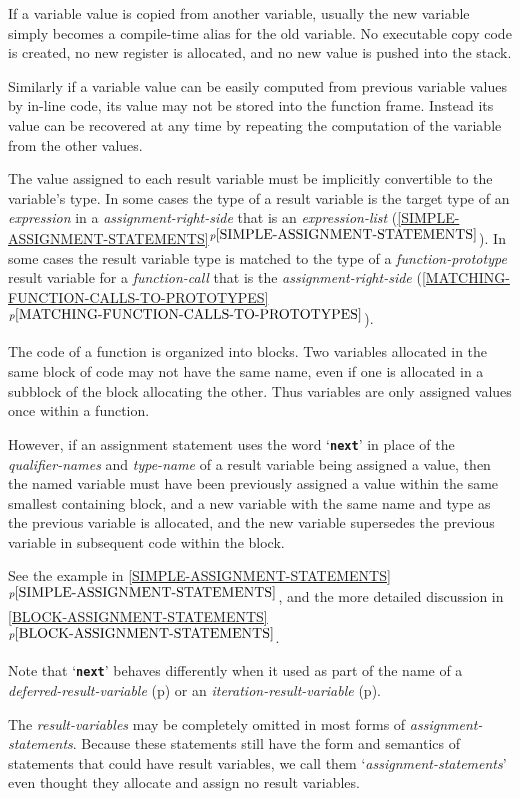 \documentclass[12pt]{article}
\newcommand{\TT}[1]{{\tt \bfseries #1}}
\newcommand{\itemref}[1]{\ref{#1}$^{p\pageref{#1}}$}
\newcommand{\pagref}[1]{p\pageref{#1}}
\begin{document}
If a variable value is copied from another variable, usually the
new variable simply becomes a compile-time alias for the old variable.
No executable copy code is created, no new register is allocated, and no new
value is pushed into the stack.

Similarly if a variable value can be easily computed from previous variable
values by in-line code, 
its value may not be stored into the function frame.  Instead its
value can be recovered at any time by repeating the computation
of the variable from the other values.

The value assigned to each result variable must be implicitly convertible to
the variable's type.  In some cases the type of a result variable is
the target type of an {\em expression} in a {\em assignment-right-side}
that is an {\em expression-list}
(\itemref{SIMPLE-ASSIGNMENT-STATEMENTS}).
In some cases the result variable type is matched to
the type of a {\em function-prototype} result variable
for a {\em function-call} that is the {\em assignment-right-side}
(\itemref{MATCHING-FUNCTION-CALLS-TO-PROTOTYPES}).

The code of a function is organized into blocks.
Two variables allocated in the same block of code may not have the same
name, even if one is allocated in a subblock of the block allocating
the other.
Thus variables are only assigned values once within a function.

However, if an assignment statement uses the word `\TT{next}' in
place of the {\em qualifier-names} and {\em type-name}
of a result variable being assigned a value, then the named variable must
have been previously assigned a value within the same smallest containing block,
and a new variable with the same
name and type as the previous variable is allocated,
and the new variable supersedes the previous variable
in subsequent code within the block.

See the example in \itemref{SIMPLE-ASSIGNMENT-STATEMENTS}, and
the more detailed discussion in 
\itemref{BLOCK-ASSIGNMENT-STATEMENTS}.

Note that `\TT{next}' behaves differently when it used as part of
the name of
a {\em deferred-result-variable} (\pagref{DEFERRED-RESULT-VARIABLE})
or an {\em iteration-result-variable} (\pagref{ITERATION-RESULT-VARIABLE}).

The {\em result-variables} may be completely omitted in most forms
of {\em assignment-statements}.  Because these statements still have
the form and semantics of statements that could have result variables,
we call them `{\em assignment-statements}' even thought they allocate
and assign no result variables.
\end{document}
